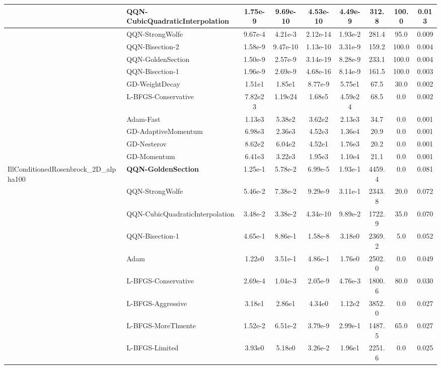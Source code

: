 \documentclass{article}
\begin{document}
\begin{longtable}{|l|l|c|c|c|c|c|c|c|}
\hline
 & QQN-CubicQuadraticInterpolation & 1.75e-9 & 9.69e-10 & 4.53e-10 & 4.49e-9 & 312.8 & 100.0 & 0.013 \\
\hline
 & QQN-StrongWolfe & 9.67e-4 & 4.21e-3 & 2.12e-14 & 1.93e-2 & 281.4 & 95.0 & 0.009 \\
\hline
 & QQN-Bisection-2 & 1.58e-9 & 9.47e-10 & 1.13e-10 & 3.31e-9 & 159.2 & 100.0 & 0.004 \\
\hline
 & QQN-GoldenSection & 1.50e-9 & 2.57e-9 & 3.14e-19 & 8.28e-9 & 233.1 & 100.0 & 0.004 \\
\hline
 & QQN-Bisection-1 & 1.96e-9 & 2.69e-9 & 4.68e-16 & 8.14e-9 & 161.5 & 100.0 & 0.003 \\
\hline
 & GD-WeightDecay & 1.51e1 & 1.85e1 & 8.77e-9 & 5.75e1 & 67.5 & 30.0 & 0.002 \\
\hline
 & L-BFGS-Conservative & 7.82e23 & 1.19e24 & 1.68e5 & 4.59e24 & 68.5 & 0.0 & 0.002 \\
\hline
 & Adam-Fast & 1.13e3 & 5.38e2 & 3.62e2 & 2.13e3 & 34.7 & 0.0 & 0.001 \\
\hline
 & GD-AdaptiveMomentum & 6.98e3 & 2.36e3 & 4.52e3 & 1.36e4 & 20.9 & 0.0 & 0.001 \\
\hline
 & GD-Nesterov & 8.62e2 & 6.04e2 & 4.52e1 & 1.76e3 & 20.2 & 0.0 & 0.001 \\
\hline
 & GD-Momentum & 6.41e3 & 3.22e3 & 1.95e3 & 1.10e4 & 21.1 & 0.0 & 0.001 \\
IllConditionedRosenbrock\_2D\_alpha100 & \textbf{QQN-GoldenSection} & 1.25e-1 & 5.78e-2 & 6.99e-5 & 1.93e-1 & 4459.4 & 0.0 & 0.081 \\
\hline
 & QQN-StrongWolfe & 5.46e-2 & 7.38e-2 & 9.29e-9 & 3.11e-1 & 2343.8 & 20.0 & 0.072 \\
\hline
 & QQN-CubicQuadraticInterpolation & 3.48e-2 & 3.38e-2 & 4.34e-10 & 9.89e-2 & 1722.9 & 35.0 & 0.070 \\
\hline
 & QQN-Bisection-1 & 4.65e-1 & 8.86e-1 & 1.58e-8 & 3.18e0 & 2369.2 & 5.0 & 0.052 \\
\hline
 & Adam & 1.22e0 & 3.51e-1 & 4.86e-1 & 1.76e0 & 2502.0 & 0.0 & 0.049 \\
\hline
 & L-BFGS-Conservative & 2.69e-4 & 1.04e-3 & 2.05e-9 & 4.76e-3 & 1800.6 & 80.0 & 0.030 \\
\hline
 & L-BFGS-Aggressive & 3.18e1 & 2.86e1 & 4.34e0 & 1.12e2 & 3852.0 & 0.0 & 0.027 \\
\hline
 & L-BFGS-MoreThuente & 1.52e-2 & 6.51e-2 & 3.79e-9 & 2.99e-1 & 1487.5 & 65.0 & 0.027 \\
\hline
 & L-BFGS-Limited & 3.93e0 & 5.18e0 & 3.26e-2 & 1.96e1 & 2251.6 & 0.0 & 0.025 \\

\end{longtable}
\end{document}
